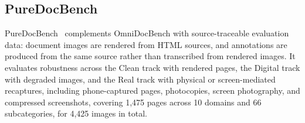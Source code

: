 \subsection{PureDocBench}

PureDocBench~\cite{puredocbench} complements OmniDocBench with source-traceable evaluation data: document images are rendered from HTML sources, and annotations are produced from the same source rather than transcribed from rendered images. It evaluates robustness across the Clean track with rendered pages, the Digital track with degraded images, and the Real track with physical or screen-mediated recaptures, including phone-captured pages, photocopies, screen photography, and compressed screenshots, covering 1,475 pages across 10 domains and 66 subcategories, for 4,425 images in total.

\begin{table}[!htbp]
\centering
\caption{PureDocBench comparison. The Clean, Digital, and Real columns report per-track overall scores; Avg3 is their mean. Public scores are transcribed from the PureDocBench main table~\cite{puredocbench}.}
\label{tab:puredoc_full}
\renewcommand{\arraystretch}{0.86}
\end{table}
